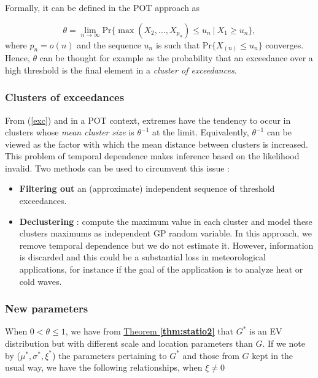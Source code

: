 Formally, it can be defined in the POT approach as

\begin{equation}\label{exc}
\theta=\displaystyle{\lim_{n \to \infty}}\text{Pr}\Big\{\max(X_2,\dots,X_{p_n})\leq u_n\ | \ X_1\geq u_n\Big\},
\end{equation}
where $p_n=o(n)$ and the sequence $u_n$ is such that Pr$\big\{X_{(n)} \leq u_n\big\}$ converges.
Hence, $\theta$ can be thought for example as the probability that an exceedance over a high threshold is the final element in a \textit{cluster of exceedances}.%


\subsubsection*{Clusters of exceedances}

From (\ref{exc}) and in a POT context, extremes have the tendency to occur in clusters whose \emph{mean cluster size} is $\theta^{-1}$ at the limit. Equivalently, $\theta^{-1}$ can be viewed as the factor with which the mean distance between clusters is increased.
This problem of temporal dependence makes inference based on the likelihood invalid.
Two methods can be used to circumvent this issue : 

\begin{itemize}
	\item \textbf{Filtering out} an (approximate) independent sequence of threshold exceedances.
	\item \textbf{Declustering} : compute the maximum value in each cluster and model these clusters maximums as independent GP random variable. In this approach, we remove temporal dependence but we do not estimate it.
	However, information is discarded and this could be a substantial loss in meteorological applications, for instance if the goal of the application is to analyze heat or cold waves.
\end{itemize}


\subsubsection*{New parameters}
 When $0<\theta\leq 1$, we have from \hyperref[thm:statio2]{Theorem \textbf{\ref{thm:statio2}}} that $G^*$ is an EV distribution but with different scale and location parameters than $G$. If we note by ($\mu^*,\sigma^*,\xi^*$) the parameters pertaining to $G^*$ and those from $G$ kept in the usual way, we have the following relationships, when $\xi\neq 0$

